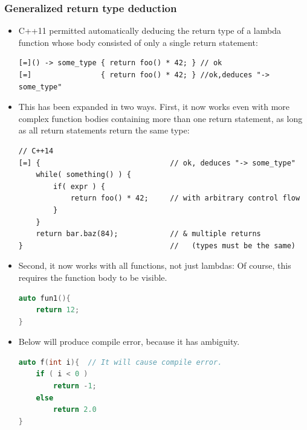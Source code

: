 \documentclass[a4paper,11pt,twoside]{book}
\begin{document}
\subsubsection{Generalized return type deduction}
\begin{itemize}
	\item C++11 permitted automatically deducing the return type of a lambda function whose body consisted of only a single return statement:
\begin{lstlisting}
[=]() -> some_type { return foo() * 42; } // ok
[=]                { return foo() * 42; } //ok,deduces "-> some_type"
\end{lstlisting}
\item This has been expanded in two ways. First, it now works even with more complex function bodies containing more than one return statement, as long as all return statements return the same type:
\begin{lstlisting}
// C++14
[=] {                              // ok, deduces "-> some_type"
	while( something() ) {
		if( expr ) {
			return foo() * 42;     // with arbitrary control flow
		}
	}
	return bar.baz(84);            // & multiple returns
}                                  //   (types must be the same)
\end{lstlisting}
\item Second, it now works with all functions, not just lambdas: Of course, this requires the function body to be visible.
\begin{lstlisting}[frame=single, language=c++]
auto fun1(){
	return 12;
}
\end{lstlisting}

	\item Below will produce compile error, because it has ambiguity.
\begin{lstlisting}[frame=single, language=c++]
auto f(int i){  // It will cause compile error.
	if ( i < 0 )
		return -1;
	else
		return 2.0
}
\end{lstlisting}

\end{itemize}
\end{document}
